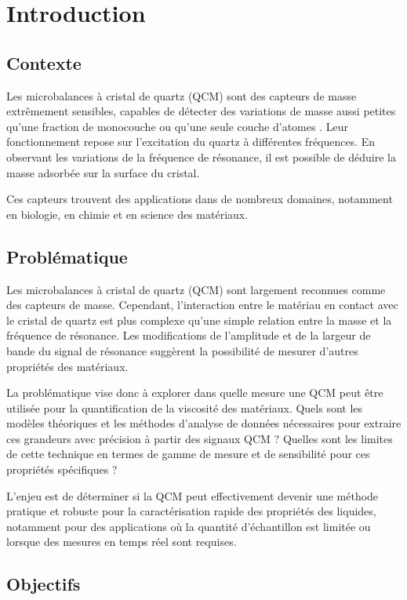 \chapter{Introduction}

\section{Contexte}

Les microbalances à cristal de quartz (QCM) sont des capteurs de masse extrêmement sensibles, capables de détecter des variations de masse aussi petites qu’une fraction de monocouche ou qu’une seule couche d’atomes \cite{Boyadjiev_WO3_2007}.  
Leur fonctionnement repose sur l’excitation du quartz à différentes fréquences.  
En observant les variations de la fréquence de résonance, il est possible de déduire la masse adsorbée sur la surface du cristal.

Ces capteurs trouvent des applications dans de nombreux domaines, notamment en biologie, en chimie et en science des matériaux.

\section{Problématique}

Les microbalances à cristal de quartz (QCM) sont largement reconnues comme des capteurs de masse. Cependant,  
l'interaction entre le matériau en contact avec le cristal de quartz est plus complexe qu'une simple relation entre la masse et la fréquence de résonance.  
Les modifications de l'amplitude et de la largeur de bande du signal de résonance suggèrent la possibilité de mesurer d'autres propriétés des matériaux.

La problématique vise donc à explorer dans quelle mesure une QCM peut être utilisée pour la quantification de la viscosité des matériaux.  
Quels sont les modèles théoriques et les méthodes d'analyse de données nécessaires pour extraire ces grandeurs avec précision à partir des signaux QCM ?  
Quelles sont les limites de cette technique en termes de gamme de mesure et de sensibilité pour ces propriétés spécifiques ?

L'enjeu est de déterminer si la QCM peut effectivement devenir une méthode pratique et robuste pour la caractérisation rapide des propriétés des liquides,  
notamment pour des applications où la quantité d'échantillon est limitée ou lorsque des mesures en temps réel sont requises.

\section{Objectifs}

